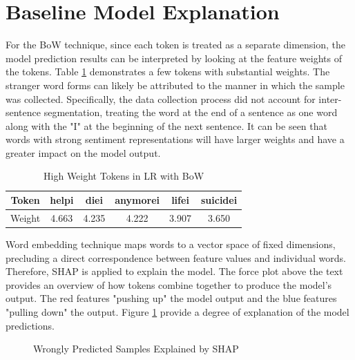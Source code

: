 \documentclass[ %
                    author={Bocheng Wang},
                supervisor={Dr. Qiang Liu},
                    degree={MSc},
                     title={A Research on Identification of Suicide Ideation in Texts with Multiple Models},
                      type={},
                      year={2024}]{dissertation}
\begin{document}
\section{Baseline Model Explanation}
\noindent
For the BoW technique, since each token is treated as a separate dimension, the model prediction results can be interpreted by looking at the feature weights of the tokens. Table \ref{tab:weights} demonstrates a few tokens with substantial weights. The stranger word forms can likely be attributed to the manner in which the sample was collected. Specifically, the data collection process did not account for inter-sentence segmentation, treating the word at the end of a sentence as one word along with the "I" at the beginning of the next sentence. It can be seen that words with strong sentiment representations will have larger weights and have a greater impact on the model output.

\begin{table}[h]
      \centering
      \begin{tabular}{c|ccccc}
            Token  & helpi & diei  & anymorei & lifei & suicidei \\
            \hline
            Weight & 4.663 & 4.235 & 4.222    & 3.907 & 3.650
      \end{tabular}
      \caption{High Weight Tokens in LR with BoW}
      \label{tab:weights}
\end{table}

Word embedding technique maps words to a vector space of fixed dimensions, precluding a direct correspondence between feature values and individual words. Therefore, SHAP is applied to explain the model. The force plot above the text provides an overview of how tokens combine together to produce the model's output. The red features "pushing up" the model output and the blue features "pulling down" the output. Figure \ref{fig:lrshap} provide a degree of explanation of the model predictions.

\begin{figure}[!h]
      \centering

      \caption{Wrongly Predicted Samples Explained by SHAP}
      \label{fig:lrshap}
\end{figure}
\end{document}
